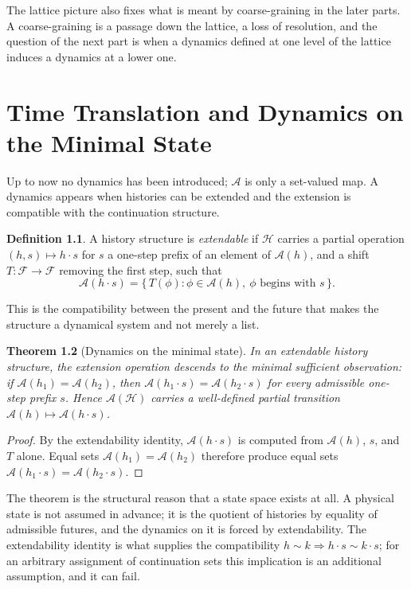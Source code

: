 \documentclass[11pt,oneside]{book}
\newtheorem{theorem}{Theorem}[chapter]
\theoremstyle{definition}
\newtheorem{definition}[theorem]{Definition}
\theoremstyle{remark}
\newcommand{\Hist}{\mathcal{H}}
\newcommand{\Fut}{\mathcal{F}}
\newcommand{\Adm}{\mathcal{A}}
\begin{document}
The lattice picture also fixes what is meant by coarse-graining in the later parts. A coarse-graining is a passage down the lattice, a loss of resolution, and the question of the next part is when a dynamics defined at one level of the lattice induces a dynamics at a lower one.

\chapter{Time Translation and Dynamics on the Minimal State}\label{ch:timetrans}

Up to now no dynamics has been introduced; $\Adm$ is only a set-valued map. A dynamics appears when histories can be extended and the extension is compatible with the continuation structure.

\begin{definition}
A history structure is \emph{extendable} if $\Hist$ carries a partial operation $(h,s)\mapsto h\cdot s$ for $s$ a one-step prefix of an element of $\Adm(h)$, and a shift $T\colon\Fut\to\Fut$ removing the first step, such that
\[
\Adm(h\cdot s)=\{\,T(\phi) : \phi\in\Adm(h),\ \phi \text{ begins with } s\,\}.
\]
\end{definition}

This is the compatibility between the present and the future that makes the structure a dynamical system and not merely a list.

\begin{theorem}[Dynamics on the minimal state]\label{thm:dyn}
In an extendable history structure, the extension operation descends to the minimal sufficient observation: if $\Adm(h_1)=\Adm(h_2)$, then $\Adm(h_1\cdot s)=\Adm(h_2\cdot s)$ for every admissible one-step prefix $s$. Hence $\Adm(\Hist)$ carries a well-defined partial transition $\Adm(h)\mapsto\Adm(h\cdot s)$.
\end{theorem}

\begin{proof}
By the extendability identity, $\Adm(h\cdot s)$ is computed from $\Adm(h)$, $s$, and $T$ alone. Equal sets $\Adm(h_1)=\Adm(h_2)$ therefore produce equal sets $\Adm(h_1\cdot s)=\Adm(h_2\cdot s)$.
\end{proof}

The theorem is the structural reason that a state space exists at all. A physical state is not assumed in advance; it is the quotient of histories by equality of admissible futures, and the dynamics on it is forced by extendability. The extendability identity is what supplies the compatibility $h\sim k\Rightarrow h\cdot s\sim k\cdot s$; for an arbitrary assignment of continuation sets this implication is an additional assumption, and it can fail.
\end{document}
